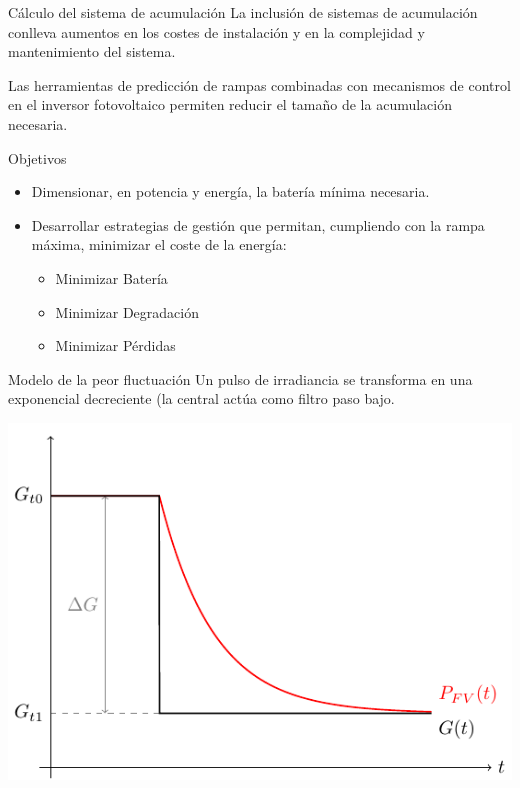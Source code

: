 \documentclass[aspectratio=169, usenames,svgnames,dvipsnames]{beamer}
\begin{document}
\begin{frame}[label={sec:org712d666}]{Cálculo del sistema de acumulación}
La inclusión de sistemas de acumulación conlleva \alert{aumentos en los
costes} de instalación y en la \alert{complejidad y mantenimiento} del
sistema.

Las herramientas de \alert{predicción} de rampas combinadas con \alert{mecanismos de
control en el inversor} fotovoltaico permiten \alert{reducir} el tamaño de la
acumulación necesaria.

\begin{block}{Objetivos}
\begin{itemize}
\item Dimensionar, en \alert{potencia y energía}, la batería mínima necesaria.
\item \alert{Desarrollar estrategias de gestión} que permitan, cumpliendo con la rampa máxima, minimizar el coste de la energía:
\begin{itemize}
\item Minimizar Batería
\item Minimizar Degradación
\item Minimizar Pérdidas
\end{itemize}
\end{itemize}
\end{block}
\end{frame}

\begin{frame}[label={sec:orge56deef}]{Modelo de la peor fluctuación}
Un pulso de irradiancia se transforma en una exponencial decreciente (la central actúa como filtro paso bajo.

\begin{center}
\includegraphics[height=0.75\textheight]{../figs/ModeloPeorFluctuacion0.pdf}
\end{center}
\end{frame}
\end{document}
